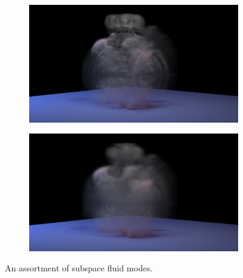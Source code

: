 \documentclass[11pt]{article}
\begin{document}
\begin{figure}
\begin{subfigure}[h]{0.5\textwidth}
	\end{subfigure}
	\begin{subfigure}[h]{0.5\textwidth}
		\centering
		\includegraphics[width=\textwidth]{Figures/renders/plume0052.png}
	\end{subfigure}
	\begin{subfigure}[h]{0.5\textwidth}
		\centering
		\includegraphics[width=\textwidth]{Figures/renders/plume0108.png}
	\end{subfigure}
	\caption{An assortment of subspace fluid modes.}
\end{figure}

\end{document}
